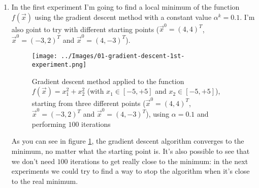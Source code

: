         \begin{enumerate}
            \item In the first experiment I'm going to find a local minimum of the function \(f(\vec{x})\) using the gradient descent method with a constant value \(\alpha^k = 0.1\). I'm also goint to try with different starting points (\(\vec{x}^0 = (4,4)^T\), \(\vec{x}^0 = (-3,2)^T\) and \(\vec{x}^0 = (4,-3)^T\)).
            \begin{figure}
                \centering
                \texttt{[image: ../Images/01-gradient-descent-1st-experiment.png]}
                \caption{Gradient descent method applied to the function \(f(\vec{x}) = x_{1}^{2} + x_{2}^{2}\) (with \(x_1 \in [-5, +5]\) and \(x_2 \in [-5, +5]\)), starting from three different points (\(\vec{x}^0 = (4,4)^T\), \(\vec{x}^0 = (-3,2)^T\) and \(\vec{x}^0 = (4,-3)^T\)), using \(\alpha = 0.1\) and performing \(100\) iterations}
                \label{gradient-descent-1st-experiment}
            \end{figure}
            As you can see in figure \ref{gradient-descent-1st-experiment}, the gradient descent algorithm converges to the minimum, no matter what the starting point is. It's also possible to see that we don't need \(100\) iterations to get really close to the minimum: in the next experiments we could try to find a way to stop the algorithm when it's close to the real minimum.
        \end{enumerate}